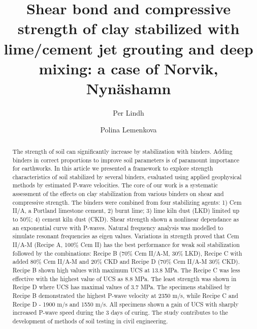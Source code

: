 \documentclass[USenglish,twocolumn]{article}
\begin{document}
 
\author[1]{Per Lindh}
\author*[2]{Polina Lemenkova}

  \title{\huge Shear bond and compressive strength of clay stabilized with lime/cement jet grouting and deep mixing: a case of Norvik, Nynäshamn}
  

\begin{abstract}
{The strength of soil can significantly increase by stabilization with binders. Adding binders in correct proportions to improve soil parameters is of paramount importance for earthworks. In this article we presented a framework to explore strength characteristics of soil stabilized by several binders, evaluated using applied geophysical methods by estimated P-wave velocities. The core of our work is a systematic assessment of the effects on clay stabilization from various binders on shear and compressive strength. The binders were combined from four stabilizing agents: 1) Cem II/A, a Portland limestone cement, 2) burnt lime; 3) lime kiln dust (LKD) limited up to 50\%; 4) cement kiln dust (CKD). Shear strength shown a nonlinear dependance as an exponential curve with P-waves. Natural frequency analysis was modelled to simulate resonant frequencies as eigen values. Variations in strength proved that Cem II/A-M (Recipe A, 100\% Cem II) has the best performance for weak soil stabilization followed by the combinations: Recipe B (70\% Cem II/A-M, 30\% LKD), Recipe C with added 80\% Cem II/A-M and 20\% CKD and Recipe D (70\% Cem II/A-M 30\% CKD). Recipe B shown high values with maximum UCS at 13.8 MPa. The Recipe C was less effective with the highest value of UCS as 8.8 MPa. The least strength was shown in Recipe D where UCS  has maximal values of 3.7 MPa. The specimens stabilised by Recipe B demonstrated the highest P-wave velocity at 2350 m/s, while Recipe C and Recipe D - 1900 m/s and 1550 m/s. All specimens shown a gain of UCS with sharply increased P-wave speed during the 3 days of curing. The study contributes to the development of methods of soil testing in civil engineering.
}
\end{abstract}
 
\end{document}
